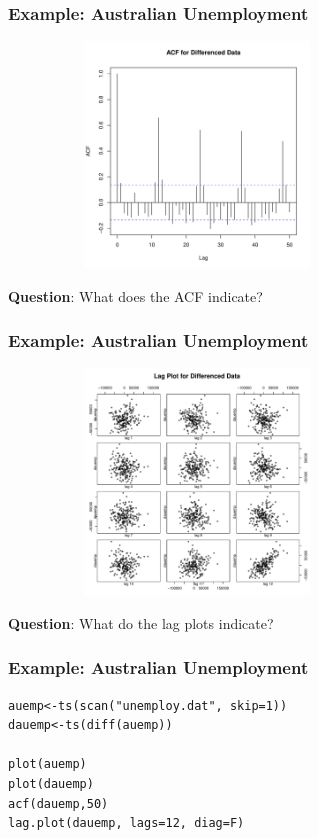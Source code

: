 \documentclass[%
xcolor=pdftex]{beamer}
\begin{document}
\begin{frame}
\frametitle{Example: Australian Unemployment}

\includegraphics[width=100mm, height=60mm]{pics/acfdauemp.pdf}

\textbf{Question}: What does the ACF indicate?

\end{frame}

\begin{frame}
\frametitle{Example: Australian Unemployment}

\includegraphics[width=100mm, height=60mm]{pics/lagplotdauemp.pdf}

\textbf{Question}: What do the lag plots indicate?

\end{frame}

\begin{frame}[fragile]
\frametitle{Example: Australian Unemployment}

\begin{verbatim}
auemp<-ts(scan("unemploy.dat", skip=1))
dauemp<-ts(diff(auemp))

plot(auemp)
plot(dauemp)
acf(dauemp,50)
lag.plot(dauemp, lags=12, diag=F)
\end{verbatim}

\end{frame}
\end{document}
